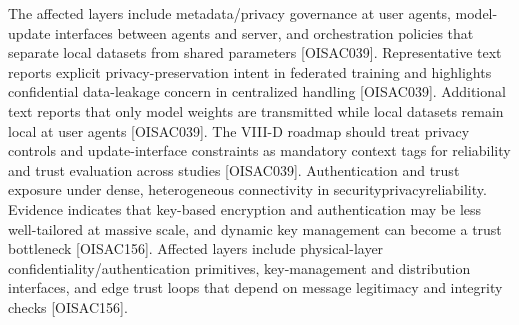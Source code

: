  The affected layers include metadata/privacy governance at user agents, model-update interfaces between agents and server, and orchestration policies that separate local datasets from shared parameters [O\markdownRendererUnderscore{}ISAC\markdownRendererUnderscore{}039].\markdownRendererOlItemEnd 
{} Representative text reports explicit privacy-preservation intent in federated training and highlights confidential data-leakage concern in centralized handling [O\markdownRendererUnderscore{}ISAC\markdownRendererUnderscore{}039]. Additional text reports that only model weights are transmitted while local datasets remain local at user agents [O\markdownRendererUnderscore{}ISAC\markdownRendererUnderscore{}039].\markdownRendererOlItemEnd 
{} The VIII-D roadmap should treat privacy controls and update-interface constraints as mandatory context tags for reliability and trust evaluation across studies [O\markdownRendererUnderscore{}ISAC\markdownRendererUnderscore{}039].\markdownRendererOlItemEnd 
\markdownRendererOlEnd \markdownRendererInterblockSeparator
{}
\markdownRendererSectionEnd \markdownRendererSectionBegin
{}\markdownRendererInterblockSeparator
{}\markdownRendererOlBegin
{} Authentication and trust exposure under dense, heterogeneous connectivity in security\markdownRendererUnderscore{}privacy\markdownRendererUnderscore{}reliability.\markdownRendererOlItemEnd 
{} Evidence indicates that key-based encryption and authentication may be less well-tailored at massive scale, and dynamic key management can become a trust bottleneck [O\markdownRendererUnderscore{}ISAC\markdownRendererUnderscore{}156].\markdownRendererOlItemEnd 
{} Affected layers include physical-layer confidentiality/authentication primitives, key-management and distribution interfaces, and edge trust loops that depend on message legitimacy and integrity checks [O\markdownRendererUnderscore{}ISAC\markdownRendererUnderscore{}156].\markdownRendererOlItemEnd 
